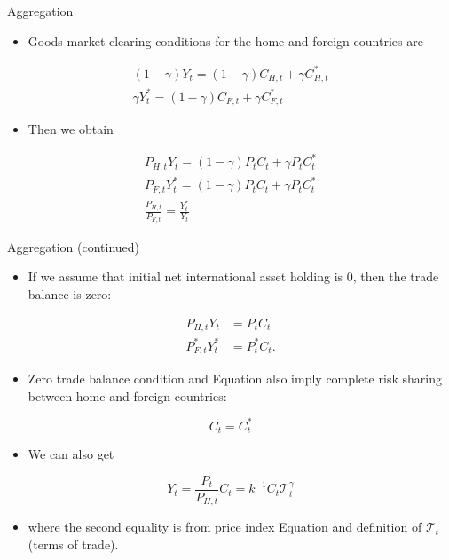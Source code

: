 \documentclass[10pt]{beamer}
\begin{document}
\begin{frame}{Aggregation}

\begin{itemize}
    \item Goods market clearing conditions for 
     the home and foreign countries are
\end{itemize}
\begin{gather*}
(1-\gamma) Y_{t}=(1-\gamma)C_{H, t}+\gamma C_{H, t}^{*} \\
\gamma Y_{t}^{*}=(1-\gamma)C_{F, t}+\gamma C_{F, t}^{*}
\end{gather*}
\begin{itemize}
    \item Then we obtain
\end{itemize}
\begin{gather*}
P_{H, t} Y_{t}=(1-\gamma)P_{t}C_{t}+\gamma P_{t}C_{t}^{*} \\
P_{F, t} Y_{t}^{*}=(1-\gamma) P_{t}C_{t}+\gamma P_{t}C_{t}^{*} \\
\frac{P_{H, t}}{P_{F, t}}=\frac{Y_{t}^{*}}{Y_{t}}
\end{gather*}

\end{frame}

\begin{frame}{Aggregation (continued)}

\begin{itemize}
    \item If we assume that initial net international asset holding is 0, then the trade balance is zero:
\end{itemize}


$$
\begin{aligned}
P_{H, t} Y_{t} & =P_{t}C_{t} \\
P_{F, t}^{*} Y_{t}^{*} & =P_{t}^{*}C_{t} .
\end{aligned}
$$

\begin{itemize}
    \item Zero trade balance condition and Equation also imply complete risk sharing between home and foreign countries:
\end{itemize}


$$
C_{t}=C_{t}^{*}
$$

\begin{itemize}
    \item We can also get
\end{itemize}


$$
Y_{t}=\frac{P_{t}}{P_{H, t}}C_{t}=k^{-1}C_{t} \mathcal{T}_{t}^{\gamma}
$$

\begin{itemize}
    \item where the second equality is from price index Equation and definition of $\mathcal{T}_t$ (terms of trade).  
\end{itemize}
  
\end{frame}
\end{document}
